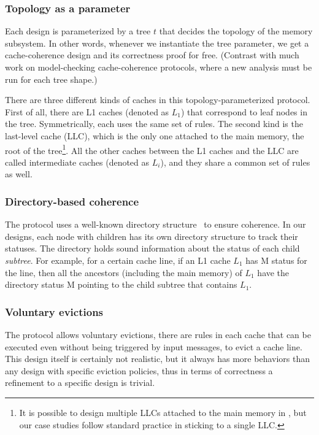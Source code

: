 \documentclass[sigplan,10pt,review,anonymous,screen]{acmart}\settopmatter{printfolios=true,printccs=false,printacmref=false}
\begin{document}
\subsubsection{Topology as a parameter}
\label{sec-topo-param}
Each design is parameterized by a tree $t$ that decides the topology of the memory subsystem.
In other words, whenever we instantiate the tree parameter, we get a cache-coherence design and its correctness proof for free.
(Contrast with much work on model-checking cache-coherence protocols, where a new analysis must be run for each tree shape.)

There are three different kinds of caches in this topology-parameterized protocol.
First of all, there are L1 caches (denoted as $L_1$) that correspond to leaf nodes in the tree.
Symmetrically, each uses the same set of rules.
The second kind is the last-level cache (LLC), which is the only one attached to the main memory, the root of the tree\footnote{It is possible to design multiple LLCs attached to the main memory in \hemiola{}, but our case studies follow standard practice in sticking to a single LLC.}.
All the other caches between the L1 caches and the LLC are called intermediate caches (denoted as $L_i$), and they share a common set of rules as well.

\subsubsection{Directory-based coherence}

The protocol uses a well-known directory structure~\cite{Tang:1976} to ensure coherence.
In our designs, each node with children has its own directory structure to track their statuses.
The directory holds sound information about the status of each child \emph{subtree}.
For example, for a certain cache line, if an L1 cache $L_1$ has M status for the line, then all the ancestors (including the main memory) of $L_1$ have the directory status M pointing to the child subtree that contains $L_1$.

\subsubsection{Voluntary evictions}

The protocol allows voluntary evictions, \ie{} there are rules in each cache that can be executed even without being triggered by input messages, to evict a cache line.
This design itself is certainly not realistic, but it always has more behaviors than any design with specific eviction policies, thus in terms of correctness a refinement to a specific design is trivial.
\end{document}
